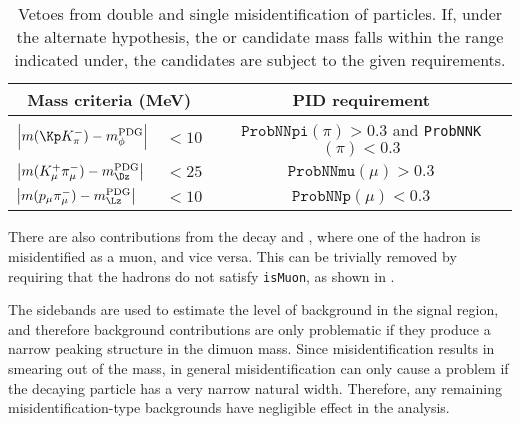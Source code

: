 \begin{table}
  \caption{
   Vetoes from double and single misidentification of particles.
   If, under the alternate hypothesis, the \db or \Kstarz candidate mass falls within the range
   indicated under, the candidates are subject to the given \pid requirements.
  }
  \label{tab:bkg:vetoes}
  \begin{center}
    \begin{tabular}{lcc}\toprule
      \multicolumn{2}{c}{Mass criteria (MeV)} & PID requirement \\\midrule
      $\left|m(\Kp K^-_\pi) - m^\mathrm{PDG}_\phi\right|$ & $<10$
      & $\mathtt{ProbNNpi}(\pi)>0.3$ and {\tt ProbNNK$(\pi)<0.3$}
      \\\rule{0pt}{3ex}$\left|m(K^+_\mu\pi^-_\mu) - m^\mathrm{PDG}_{\Dz}\right|$& $<25$
      & $\mathtt{ProbNNmu}(\mu)>0.3$
      \\\rule{0pt}{3ex}$\left|m(p_\mu\pi^-_\mu) - m^\mathrm{PDG}_{\Lz}\right|$ & $<10$
      & $\mathtt{ProbNNp}(\mu)<0.3$  \\
      \bottomrule
    \end{tabular}
  \end{center}
\end{table}

There are also contributions from the decay \decay{\Bd}{\jpsi\Kstarz} and \decay{\jpsi}{\mumu},
where one of the hadron is misidentified as a muon, and vice versa.
This can be trivially removed by requiring that the hadrons do not satisfy {\tt isMuon}, as shown
in .


The sidebands are used to estimate the level of background in the signal region, and therefore
background
contributions are only problematic if they produce a narrow peaking structure in the dimuon mass.
Since misidentification results in smearing out of the mass, in general misidentification can only
cause a problem if the decaying particle has a very narrow natural width.
Therefore, any remaining misidentification-type backgrounds have negligible effect in the analysis.






